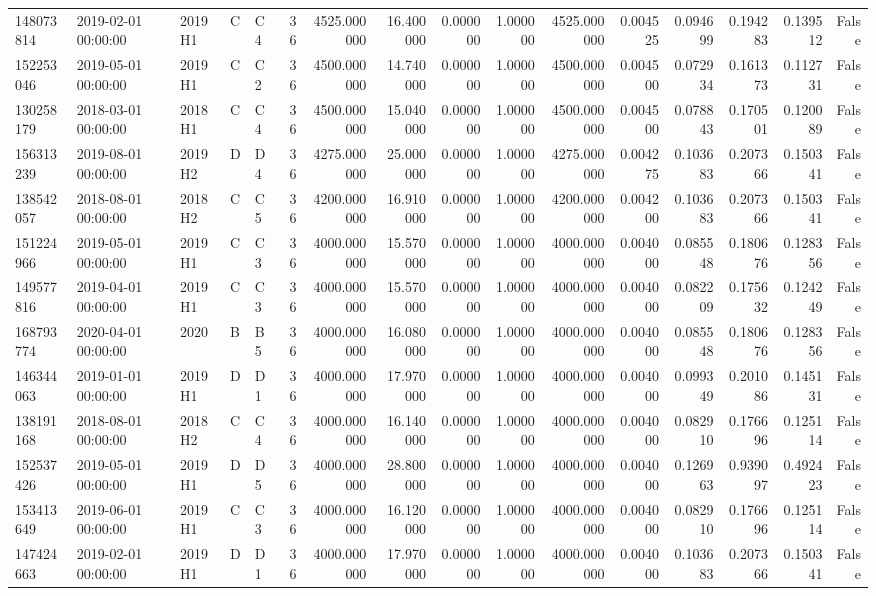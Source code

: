 \begin{tabular}{lllllrrrrrrrrrrr}
148073814 & 2019-02-01 00:00:00 & 2019H1 & C & C4 & 36 & 4525.000000 & 16.400000 & 0.000000 & 1.000000 & 4525.000000 & 0.004525 & 0.094699 & 0.194283 & 0.139512 & False \\
152253046 & 2019-05-01 00:00:00 & 2019H1 & C & C2 & 36 & 4500.000000 & 14.740000 & 0.000000 & 1.000000 & 4500.000000 & 0.004500 & 0.072934 & 0.161373 & 0.112731 & False \\
130258179 & 2018-03-01 00:00:00 & 2018H1 & C & C4 & 36 & 4500.000000 & 15.040000 & 0.000000 & 1.000000 & 4500.000000 & 0.004500 & 0.078843 & 0.170501 & 0.120089 & False \\
156313239 & 2019-08-01 00:00:00 & 2019H2 & D & D4 & 36 & 4275.000000 & 25.000000 & 0.000000 & 1.000000 & 4275.000000 & 0.004275 & 0.103683 & 0.207366 & 0.150341 & False \\
138542057 & 2018-08-01 00:00:00 & 2018H2 & C & C5 & 36 & 4200.000000 & 16.910000 & 0.000000 & 1.000000 & 4200.000000 & 0.004200 & 0.103683 & 0.207366 & 0.150341 & False \\
151224966 & 2019-05-01 00:00:00 & 2019H1 & C & C3 & 36 & 4000.000000 & 15.570000 & 0.000000 & 1.000000 & 4000.000000 & 0.004000 & 0.085548 & 0.180676 & 0.128356 & False \\
149577816 & 2019-04-01 00:00:00 & 2019H1 & C & C3 & 36 & 4000.000000 & 15.570000 & 0.000000 & 1.000000 & 4000.000000 & 0.004000 & 0.082209 & 0.175632 & 0.124249 & False \\
168793774 & 2020-04-01 00:00:00 & 2020 & B & B5 & 36 & 4000.000000 & 16.080000 & 0.000000 & 1.000000 & 4000.000000 & 0.004000 & 0.085548 & 0.180676 & 0.128356 & False \\
146344063 & 2019-01-01 00:00:00 & 2019H1 & D & D1 & 36 & 4000.000000 & 17.970000 & 0.000000 & 1.000000 & 4000.000000 & 0.004000 & 0.099349 & 0.201086 & 0.145131 & False \\
138191168 & 2018-08-01 00:00:00 & 2018H2 & C & C4 & 36 & 4000.000000 & 16.140000 & 0.000000 & 1.000000 & 4000.000000 & 0.004000 & 0.082910 & 0.176696 & 0.125114 & False \\
152537426 & 2019-05-01 00:00:00 & 2019H1 & D & D5 & 36 & 4000.000000 & 28.800000 & 0.000000 & 1.000000 & 4000.000000 & 0.004000 & 0.126963 & 0.939097 & 0.492423 & False \\
153413649 & 2019-06-01 00:00:00 & 2019H1 & C & C3 & 36 & 4000.000000 & 16.120000 & 0.000000 & 1.000000 & 4000.000000 & 0.004000 & 0.082910 & 0.176696 & 0.125114 & False \\
147424663 & 2019-02-01 00:00:00 & 2019H1 & D & D1 & 36 & 4000.000000 & 17.970000 & 0.000000 & 1.000000 & 4000.000000 & 0.004000 & 0.103683 & 0.207366 & 0.150341 & False \\

\end{tabular}
